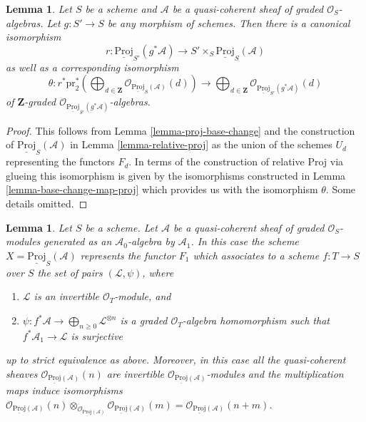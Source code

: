 \documentclass{stacks-project}
\theoremstyle{plain}
\newtheorem{lemma}[subsection]{Lemma}
\theoremstyle{definition}
\theoremstyle{remark}
\numberwithin{equation}{subsection}
\begin{document}
\begin{lemma}
\label{lemma-relative-proj-base-change}
Let $S$ be a scheme and $\mathcal{A}$ be a quasi-coherent sheaf
of graded $\mathcal{O}_S$-algebras. Let $g : S' \to S$ be any morphism
of schemes. Then there is a canonical isomorphism
$$
r :
\underline{\text{Proj}}_{S'}(g^*\mathcal{A})
\longrightarrow
S' \times_S \underline{\text{Proj}}_S(\mathcal{A})
$$
as well as a corresponding isomorphism
$$
\theta :
r^*\text{pr}_2^*\left(\bigoplus\nolimits_{d \in \mathbf{Z}}
\mathcal{O}_{\underline{\text{Proj}}_S(\mathcal{A})}(d)\right)
\longrightarrow
\bigoplus\nolimits_{d \in \mathbf{Z}}
\mathcal{O}_{\underline{\text{Proj}}_{S'}(g^*\mathcal{A})}(d)
$$
of $\mathbf{Z}$-graded
$\mathcal{O}_{\underline{\text{Proj}}_{S'}(g^*\mathcal{A})}$-algebras.
\end{lemma}

\begin{proof}
This follows from Lemma \ref{lemma-proj-base-change} and the construction
of $\underline{\text{Proj}}_S(\mathcal{A})$ in
Lemma \ref{lemma-relative-proj} as the union
of the schemes $U_d$ representing the functors $F_d$.
In terms of the construction of relative Proj via glueing
this isomorphism is given by the isomorphisms constructed
in Lemma \ref{lemma-base-change-map-proj} which provides us with
the isomorphism $\theta$. Some details omitted.
\end{proof}

\begin{lemma}
\label{lemma-apply-relative}
Let $S$ be a scheme.
Let $\mathcal{A}$ be a quasi-coherent sheaf of graded $\mathcal{O}_S$-modules
generated as an $\mathcal{A}_0$-algebra by $\mathcal{A}_1$.
In this case the scheme $X = \underline{\text{Proj}}_S(\mathcal{A})$
represents the functor $F_1$ which associates to a scheme
$f : T \to S$ over $S$ the set of pairs $(\mathcal{L}, \psi)$, where
\begin{enumerate}
\item $\mathcal{L}$ is an invertible $\mathcal{O}_T$-module, and
\item $\psi : f^*\mathcal{A} \to \bigoplus_{n \geq 0} \mathcal{L}^{\otimes n}$
is a graded $\mathcal{O}_T$-algebra homomorphism such that
$f^*\mathcal{A}_1 \to \mathcal{L}$ is surjective
\end{enumerate}
up to strict equivalence as above. Moreover, in this case all the
quasi-coherent sheaves
$\mathcal{O}_{\underline{\text{Proj}}(\mathcal{A})}(n)$
are invertible
$\mathcal{O}_{\underline{\text{Proj}}(\mathcal{A})}$-modules
and the multiplication maps induce isomorphisms
$
\mathcal{O}_{\underline{\text{Proj}}(\mathcal{A})}(n)
\otimes_{\mathcal{O}_{\underline{\text{Proj}}(\mathcal{A})}}
\mathcal{O}_{\underline{\text{Proj}}(\mathcal{A})}(m) =
\mathcal{O}_{\underline{\text{Proj}}(\mathcal{A})}(n + m)$.
\end{lemma}
\end{document}
